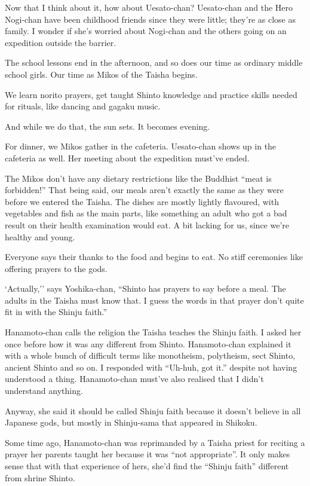 Now that I think about it, how about Uesato-chan? Uesato-chan and the Hero Nogi-chan have been childhood friends since they were little; they're as close as family. I wonder if she's worried about Nogi-chan and the others going on an expedition outside the barrier.

The school lessons end in the afternoon, and so does our time as ordinary middle school girls. Our time as Mikos of the Taisha begins.

We learn norito prayers, get taught Shinto knowledge and practice skills needed for rituals, like dancing and gagaku music.

And while we do that, the sun sets. It becomes evening.

For dinner, we Mikos gather in the cafeteria. Uesato-chan shows up in the cafeteria as well. Her meeting about the expedition must've ended.

The Mikos don't have any dietary restrictions like the Buddhist ``meat is forbidden!'' That being said, our meals aren't exactly the same as they were before we entered the Taisha. The dishes are mostly lightly flavoured, with vegetables and fish as the main parts, like something an adult who got a bad result on their health examination would eat. A bit lacking for us, since we're healthy and young.

Everyone says their thanks to the food and begins to eat. No stiff ceremonies like offering prayers to the gods.

`Actually,'' says Yoshika-chan, ``Shinto has prayers to say before a meal. The adults in the Taisha must know that. I guess the words in that prayer don't quite fit in with the Shinju faith.''

Hanamoto-chan calls the religion the Taisha teaches the Shinju faith. I asked her once before how it was any different from Shinto. Hanamoto-chan explained it with a whole bunch of difficult terms like monotheism, polytheism, sect Shinto, ancient Shinto and so on. I responded with ``Uh-huh, got it.'' despite not having understood a thing. Hanamoto-chan must've also realised that I didn't understand anything.

Anyway, she said it should be called Shinju faith because it doesn't believe in all Japanese gods, but mostly in Shinju-sama that appeared in Shikoku.

Some time ago, Hanamoto-chan was reprimanded by a Taisha priest for reciting a prayer her parents taught her because it was ``not appropriate''. It only makes sense that with that experience of hers, she'd find the ``Shinju faith'' different from shrine Shinto.

